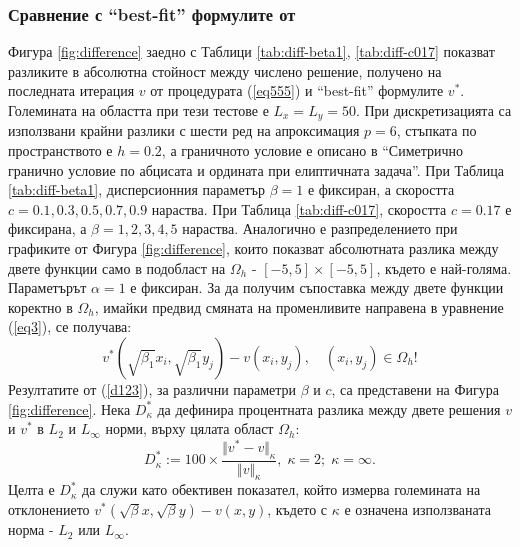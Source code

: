 \documentclass[a4paper]{article}
\newcommand{\be}{\begin{equation}}
\newcommand{\ee}{\end{equation}}
\newcommand{\rf}[1]{(\ref{#1})}
\theoremstyle{remark}
\begin{document}
\begin{large}
\subsubsection{Сравнение с ``best-fit'' формулите от \cite{ref15} }
Фигура \ref{fig:difference} заедно с Таблици \ref{tab:diff-beta1}, \ref{tab:diff-c017} показват разликите в абсолютна стойност между числено решение, получено на последната итерация $v$ от процедурата \rf{eq555} и ``best-fit'' формулите $v^*$. Големината на областта при тези тестове е $L_x = L_y = 50$. При дискретизацията са използвани крайни разлики с шести ред на апроксимация $p=6$, стъпката по пространството е $h=0.2$, а граничното условие е описано в ``Симетрично гранично условие по абцисата и ордината при елиптичната задача''. При Таблица \ref{tab:diff-beta1}, дисперсионния параметър $\beta=1$ е фиксиран, а скоростта $c = 0.1, 0.3, 0.5, 0.7, 0.9$ нараства. При Таблица \ref{tab:diff-c017}, скоростта $c = 0.17$ е фиксирана, а $\beta=1, 2, 3, 4, 5$ нараства. Аналогично е разпределението при графиките от Фигура \ref{fig:difference}, които показват абсолютната разлика между двете функции само в подобласт на $\Omega_h$ - $[-5,  5] \times [-5,5]$, където е най-голяма. Параметърът $\alpha = 1$ е фиксиран. За да получим съпоставка между двете функции коректно в $\Omega_h$, имайки предвид смяната на променливите направена в уравнение \rf{eq3}, се получава:
\be\label{d123}
v^*\left(\sqrt{\beta_1}x_i,\sqrt{\beta_1}y_j\right)-v(x_i,y_j), \quad (x_i,y_j) \in \Omega_h !
\ee
Резултатите от \rf{d123}, за различни параметри $\beta$ и $c$, са представени на Фигура \ref{fig:difference}. Нека $D^*_{\kappa}$ да дефинира процентната разлика между двете решения $v$ и $v^*$ в ${L_2 }$ и ${L_\infty}$ норми, върху цялата област $\Omega_h$:
\be\label{diffvv}
D^*_{\kappa} := 100 \times \frac{\Vert v^*-v \Vert_{\kappa} }{ \Vert v \Vert_{\kappa} }, \; \kappa=2; \; \kappa=\infty.
\ee
Целта е $D^*_{\kappa}$ да служи като обективен показател, който измерва големината на отклонението $v^*(\sqrt{\beta}x,\sqrt{\beta}y)-v(x,y)$, където с $\kappa$ е означена използваната норма - ${L_2 }$ или ${L_\infty}$.


\end{large}
\end{document}
